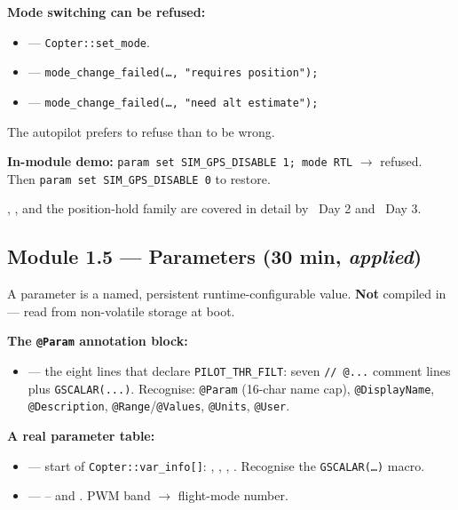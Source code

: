 \documentclass[a4paper,11pt,twoside]{article}
\renewcommand{\instadvanced}[1]{\ifinstructor\begin{tcolorbox}[colback=violet!5!white,colframe=violet!50!black,title=Advanced material pointer,breakable]#1\end{tcolorbox}\fi}
\begin{document}
\textbf{Mode switching can be refused:}
\begin{itemize}
  \item {} --- \texttt{Copter::set\_mode}.
  \item {} --- \texttt{mode\_change\_failed(\dots, "requires position");}
  \item {} --- \texttt{mode\_change\_failed(\dots, "need alt estimate");}
\end{itemize}
The autopilot prefers to refuse than to be wrong.

\textbf{In-module demo:} \texttt{param set SIM\_GPS\_DISABLE 1; mode RTL} $\rightarrow$ refused. Then \texttt{param set SIM\_GPS\_DISABLE 0} to restore.

\instadvanced{, , and the position-hold family are covered in detail by \siblingplane\ Day 2 and \siblingquadplane\ Day 3.}

\subsection{Module 1.5 --- Parameters (30 min, \emph{applied})}

A parameter is a named, persistent runtime-configurable value. \textbf{Not} compiled in --- read from non-volatile storage at boot.

\textbf{The \texttt{@Param} annotation block:}
\begin{itemize}
  \item {} --- the eight lines that declare \texttt{PILOT\_THR\_FILT}: seven \texttt{// @...} comment lines plus \texttt{GSCALAR(...)}. Recognise: \texttt{@Param} (16-char name cap), \texttt{@DisplayName}, \texttt{@Description}, \texttt{@Range}/\texttt{@Values}, \texttt{@Units}, \texttt{@User}.
\end{itemize}

\textbf{A real parameter table:}
\begin{itemize}
  \item {} --- start of \texttt{Copter::var\_info[]}: , , , . Recognise the \texttt{GSCALAR(\dots)} macro.
  \item {} --- -- and . PWM band $\rightarrow$ flight-mode number.
\end{itemize}
\end{document}
